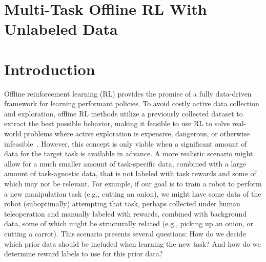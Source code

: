 \documentclass[../thesis.tex]{subfiles}
\begin{document}

\section*{Multi-Task Offline RL With Unlabeled Data}

\section{Introduction}
Offline reinforcement learning (RL) provides the promise of a fully data-driven framework for learning performant policies. To avoid costly active data collection and exploration, offline RL methods utilize a previously collected dataset to extract the best possible behavior, making it feasible to use RL to solve real-world problems where active exploration is expensive, dangerous, or otherwise infeasible~\citep{zhan2021deepthermal, de2021discovering, Wang2018SupervisedRL, kalashnikov2018scalable}. 
However, this concept is only viable when a significant amount of data for the target task is available in advance. A more realistic scenario might allow for a much smaller amount of task-specific data, combined with a large amount of task-agnostic data, that is not labeled with task rewards and some of which may not be relevant. For example, if our goal is to train a robot to perform a new manipulation task (e.g., cutting an onion), we might have some data of the robot (suboptimally) attempting that task, perhaps collected under human teleoperation and manually labeled with rewards, combined with background data, some of which might be structurally related (e.g., picking up an onion, or cutting a carrot). {This scenario presents several questions: How do we decide which prior data should be included when learning the new task? And how do we determine reward labels to use for this prior data?}
\end{document}
